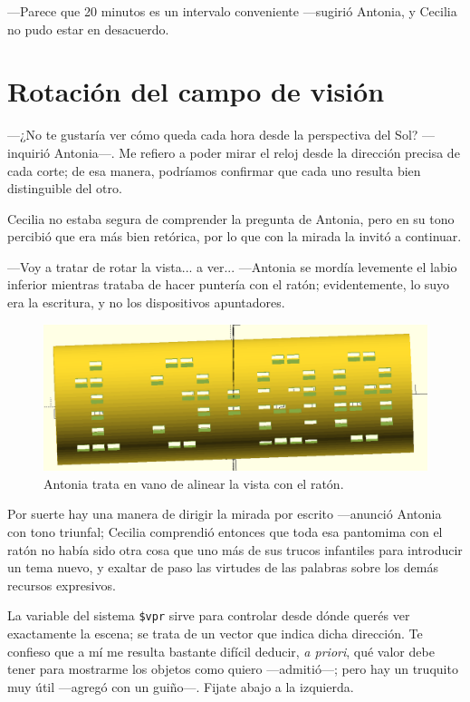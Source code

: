 ---Parece que 20 minutos es un intervalo conveniente ---su\-gi\-rió
Antonia, y Cecilia no pudo estar en desacuerdo.

\section{Rotación del campo de visión}

---¿No te gustaría ver cómo queda cada hora desde la perspectiva del
Sol? ---inquirió Antonia---. Me refiero a poder mirar el reloj desde
la dirección precisa de cada corte; de esa manera, podríamos confirmar
que cada uno resulta bien distinguible del otro.

Cecilia no estaba segura de comprender la pregunta de Antonia, pero en
su tono percibió que era más bien retórica, por lo que con la mirada
la invitó a continuar.

---Voy a tratar de rotar la vista... a ver... ---Antonia se mordía
levemente el labio inferior mientras trataba de hacer puntería con el
ratón; evidentemente, lo suyo era la escritura, y no los dispositivos
apuntadores.


\begin{figure}[ht]
  \centering
  \includegraphics[width=.75\textwidth]{imagenes/vpr-mouse}  
  \caption{Antonia trata en vano de alinear la vista con el ratón.}
  \label{fig:vpr-mouse}
\end{figure}


\guillemotright Por suerte hay una manera de dirigir la mirada por
escrito ---anunció Antonia con tono triunfal; Cecilia comprendió
entonces que toda esa pantomima con el ratón no había sido otra cosa
que uno más de sus trucos infantiles para introducir un tema nuevo, y
exaltar de paso las virtudes de las palabras sobre los demás recursos
expresivos.

\guillemotright La variable del sistema \texttt{\$vpr} sirve para
controlar desde dónde querés ver exactamente la escena; se trata de un
vector que indica dicha dirección. Te confieso que a mí me resulta
bastante difícil deducir, \emph{a priori}, qué valor debe tener para
mostrarme los objetos como quiero ---admitió---; pero hay un truquito
muy útil ---agregó con un guiño---. Fijate abajo a la izquierda.

